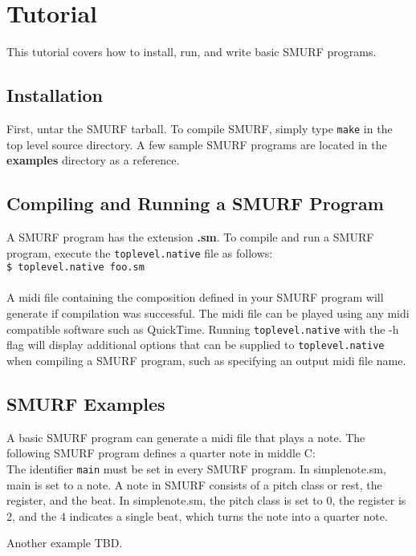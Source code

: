 \section{Tutorial}
This tutorial covers how to install, run, and write basic SMURF programs.

\subsection{Installation} 
First, untar the SMURF tarball. To compile SMURF, simply type \texttt{make} in the top level source directory. A few sample SMURF programs are located in the \textbf{examples} directory as a reference.

\subsection{Compiling and Running a SMURF Program}
A SMURF program has the extension \textbf{.sm}. To compile and run a SMURF program, execute the \texttt{toplevel.native} file as follows:\\

\texttt{\$ toplevel.native foo.sm}\\\\
A midi file containing the composition defined in your SMURF program will generate if compilation was successful. The midi file can be played using any midi compatible software such as QuickTime. Running \texttt{toplevel.native} with the -h flag will display additional options that can be supplied to \texttt{toplevel.native} when compiling a SMURF program, such as specifying an output midi file name.

\subsection{SMURF Examples}

A basic SMURF program can generate a midi file that plays a note. The following SMURF program defines a quarter note in middle C:\\



The identifier \texttt{main} must be set in every SMURF program. In simplenote.sm, main is set to a note.  A note in SMURF consists of a pitch class or rest, the register, and the beat. In simplenote.sm, the pitch class is set to 0, the register is 2, and the 4 indicates a single beat, which turns the note into a quarter note.

Another example TBD.
